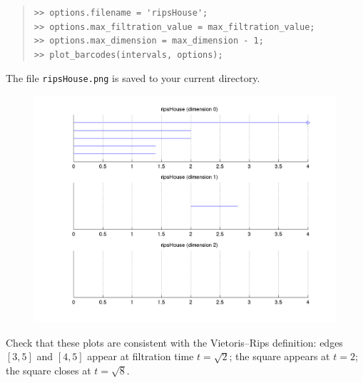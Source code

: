 \documentclass[amscd, amssymb, verbatim]{amsart}[12pt]
\theoremstyle{remark}
\newtheorem{exercise}{Exercise}
\theoremstyle{remark}
\theoremstyle{remark}
\begin{document}
\begin{quote} \begin{verbatim}
>> options.filename = 'ripsHouse';
>> options.max_filtration_value = max_filtration_value;
>> options.max_dimension = max_dimension - 1;
>> plot_barcodes(intervals, options);
\end{verbatim} \end{quote}

The file \texttt{ripsHouse.png} is saved to your current directory.

\begin{figure}[htp]
	\begin{center}
    	\includegraphics[width=6in]{ripsHouse.png}
   	\end{center}
\end{figure}
\FloatBarrier

Check that these plots are consistent with the Vietoris--Rips definition: edges $[3,5]$ and $[4,5]$ appear at filtration time $t = \sqrt{2}$; the square appears at $t = 2$; the square closes at $t = \sqrt{8}$. 

%
%
\end{document}
